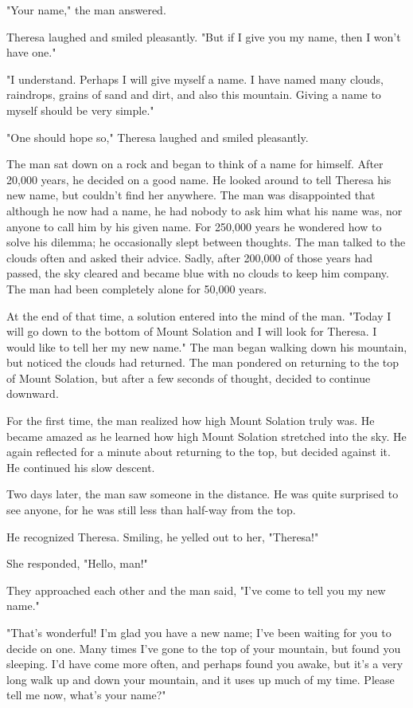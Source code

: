 "Your name," the man answered.

Theresa laughed and smiled pleasantly. "But if I give you my name, then I won't have one."

"I understand. Perhaps I will give myself a name. I have named many clouds, raindrops, grains of sand and dirt, and also this mountain. Giving a name to myself should be very simple."

"One should hope so," Theresa laughed and smiled pleasantly.

The man sat down on a rock and began to think of a name for himself. After 20,000 years, he decided on a good name. He looked around to tell Theresa his new name, but couldn't find her anywhere. The man was disappointed that although he now had a name, he had nobody to ask him what his name was, nor anyone to call him by his given name. For 250,000 years he wondered how to solve his dilemma; he occasionally slept between thoughts. The man talked to the clouds often and asked their advice. Sadly, after 200,000 of those years had passed, the sky cleared and became blue with no clouds to keep him company. The man had been completely alone for 50,000 years.

At the end of that time, a solution entered into the mind of the man. "Today I will go down to the bottom of Mount Solation and I will look for Theresa. I would like to tell her my new name." The man began walking down his mountain, but noticed the clouds had returned. The man pondered on returning to the top of Mount Solation, but after a few seconds of thought, decided to continue downward.

For the first time, the man realized how high Mount Solation truly was. He  became amazed as he learned how high Mount Solation stretched into the sky. He again reflected for a minute about returning to the top, but decided against it. He continued his slow descent.

Two days later, the man saw someone in the distance. He was quite surprised to see anyone, for he was still less than half-way from the top.

He recognized Theresa. Smiling, he yelled out to her, "Theresa!"

She responded, "Hello, man!"

They approached each other and the man said, "I've come to tell you my new name."

"That's wonderful! I'm glad you have a new name; I've been waiting for you to decide on one. Many times I've gone to the top of your mountain, but found you sleeping. I'd have come more often, and perhaps found you awake, but it's a very long walk up and down your mountain, and it uses up much of my time. Please tell me now, what's your name?"


